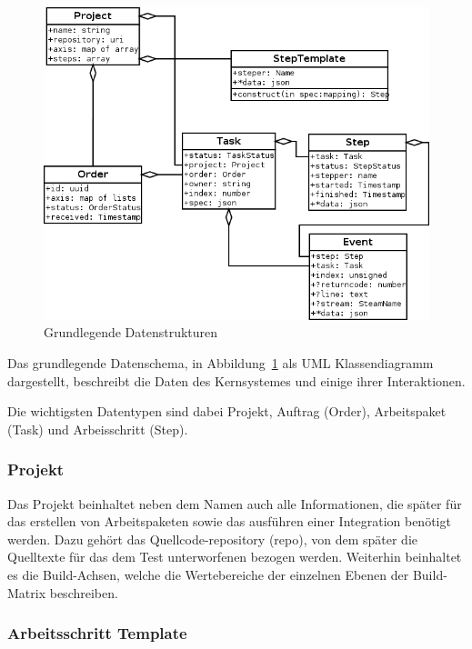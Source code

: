 \begin{figure}[ht] 
  \centering
  \label{fig:datenstrukturen}
  \includegraphics[width=\textwidth]{imageinput/datenstrukturen-step-templates.png}
  \caption{Grundlegende Datenstrukturen}
\end{figure}

Das grundlegende Datenschema, in Abbildung~\ref{fig:datenstrukturen} als UML Klassendiagramm dargestellt,
beschreibt die Daten des Kernsystemes und einige ihrer Interaktionen.

Die wichtigsten Datentypen sind dabei Projekt, Auftrag (Order),
Arbeitspaket (Task) und Arbeisschritt (Step).

\subsubsection{Projekt}

Das Projekt beinhaltet neben dem Namen auch alle Informationen,
die später für das erstellen von Arbeitspaketen sowie
das ausf\"uhren einer Integration benötigt werden.
Dazu geh\"ort das Quellcode-repository (repo), von dem sp\"ater
die Quelltexte f\"ur das dem Test unterworfenen bezogen werden.
Weiterhin beinhaltet es die Build-Achsen,
welche die Wertebereiche der einzelnen Ebenen der Build-Matrix
beschreiben.

\subsubsection{Arbeitsschritt Template}

